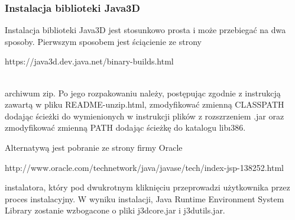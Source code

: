 \subsubsection{Instalacja biblioteki Java3D}
Instalacja biblioteki Java3D jest stosunkowo prosta i może przebiegać na dwa sposoby.
Pierwszym sposobem jest ściącienie ze strony 
\begin{center}
https://java3d.dev.java.net/binary-builds.html
\end{center} \\
 archiwum zip. Po jego rozpakowaniu należy, postępując zgodnie z instrukcją zawartą w pliku README-unzip.html, zmodyfikować zmienną CLASSPATH dodając ścieżki do wymienionych w instrukcji plików z rozszrzeniem .jar oraz zmodyfikować zmienną PATH dodając ścieżkę do katalogu lib\i386.


Alternatywą jest pobranie ze strony firmy Oracle 
\begin{center}
http://www.oracle.com/technetwork/java/javase/tech/index-jsp-138252.html \\
\end{center}
instalatora, który pod dwukrotnym kliknięciu przeprowadzi użytkownika przez proces instalacyjny. 
W wyniku instalacji, Java Runtime Environment System Library zostanie wzbogacone o pliki j3dcore.jar i j3dutils.jar.
